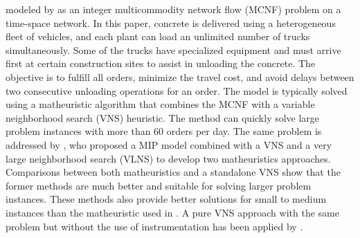 \documentclass{article}
\begin{document}
modeled by \cite{schmid2009hybrid} as an integer multicommodity network flow (MCNF) problem on a time-space network. In this paper, concrete is delivered using a heterogeneous fleet of vehicles, and each plant can load an unlimited number of trucks simultaneously. Some of the trucks have specialized equipment and must arrive first at certain construction sites to assist in unloading the concrete. The objective is to fulfill all orders, minimize the travel cost, and avoid delays between two consecutive unloading operations for an order. The model is typically solved using a matheuristic algorithm that combines the MCNF with a variable neighborhood search (VNS) heuristic. The method can quickly solve large problem instances with more than 60 orders per day. The same problem is addressed by \cite{schmid2010hybridization}, who proposed a MIP model combined with a VNS and a very large neighborhood search (VLNS) to develop two matheuristics approaches. Comparisons between both matheuristics and a standalone VNS show that the former methods are much better and suitable for solving larger problem instances. These methods also provide better solutions for small to medium instances than the matheuristic used in \cite{schmid2009hybrid}. A pure VNS approach with the same problem but without the use of instrumentation has been applied by \cite{payr2009optimizing}.
\end{document}
